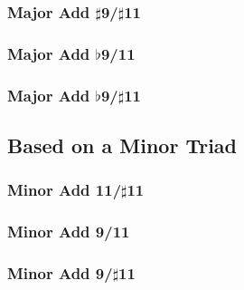 \documentclass[english]{./gbook}
\begin{document}
\begin{large}
\subsubsection{Major Add $\sharp$9/$\sharp$11}

\subsubsection{Major Add $\flat$9/11}

\subsubsection{Major Add $\flat$9/$\sharp$11}

\subsection{Based on a Minor Triad}

\subsubsection{Minor Add 11/$\sharp$11}

\subsubsection{Minor Add 9/11}

\subsubsection{Minor Add 9/$\sharp$11}


\end{large}
\end{document}
